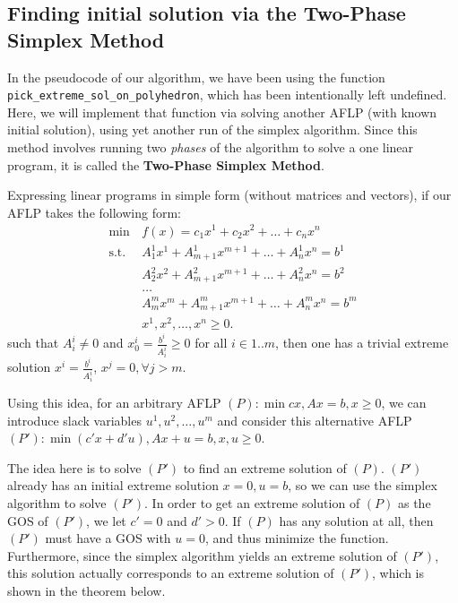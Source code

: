 \subsection{Finding initial solution via the Two-Phase Simplex Method} %
\label{sub:Finding initial solution via the Two-Phase Simplex Method}

In the pseudocode of our algorithm, we have been using the function\\
\verb|pick_extreme_sol_on_polyhedron|, which has been intentionally left
undefined. Here, we will implement that function via solving another AFLP (with
known initial solution), using yet another run of the simplex algorithm. Since
this method involves running two \textit{phases} of the algorithm to solve a
one linear program, it is called the \textbf{Two-Phase Simplex Method}.

Expressing linear programs in simple form (without matrices and vectors), if our
AFLP takes the following form:
\begin{align*}
  \min\, &f(x) = c_{1}x^{1} + c_{2}x^{2} + \ldots + c_{n}x^{n}\\
  \text{s.t.}\,&A_{1}^{1}x^{1} + A^{1}_{m + 1}x^{m + 1} + \ldots  +
  A^{1}_{n}x^{n} = b^{1} \\
               &A_{2}^{2}x^{2} + A^{2}_{m+1}x^{m+1} + \ldots  +
               A^{2}_{n}x^{n} = b^{2}\\
               &\ldots\\
               &A_{m}^{m}x^{m} +A^{m}_{m + 1}x^{m + 1} + \ldots  +
  A^{m}_{n}x^{n} = b^{m} \\
               &x^{1}, x^{2}, \ldots , x^{n} \ge 0
.\end{align*} such that \( A^{i}_{i} \neq 0 \) and \( x_{0}^{i} =
\frac{b^{i}}{A^{i}_{i}} \ge 0 \) for all \( i \in 1..m \), then one has a
trivial extreme solution \( x^{i} = \frac{b^{i}}{A^{i}_{i}} \), \( x^{j} = 0,
\forall j > m \).

Using this idea, for an arbitrary AFLP \( (P): \min cx, Ax = b, x \ge 0  \), we
can introduce slack variables \( u^{1}, u^{2}, \ldots , u^{m} \) and consider
this alternative AFLP \( (P'): \min (c'x + d'u), Ax + u = b, x, u \ge 0 \).

The idea here is to solve \( (P') \) to find an extreme solution of \( (P) \).
\( (P') \) already has an initial extreme solution \( x = 0, u = b \), so we can
use the simplex algorithm to solve \( (P') \). In order to get an extreme
solution of \( (P) \) as the GOS of \( (P') \), we let \( c' = 0 \) and \( d' >
0\). If \( (P) \) has any solution at all, then \( (P') \) must have a GOS with
\( u = 0 \), and thus minimize the function. Furthermore, since the simplex
algorithm yields an extreme solution of \( (P') \), this solution actually
corresponds to an extreme solution of \( (P') \), which is shown in the theorem
below.


